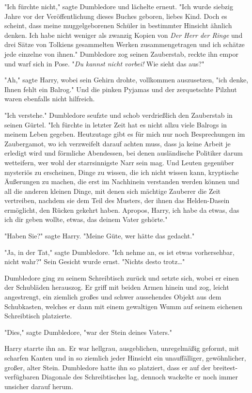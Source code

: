 {"Ich fürchte nicht," sagte Dumbledore und lächelte erneut. "Ich wurde siebzig Jahre vor der Veröffentlichung dieses Buches geboren, liebes Kind. Doch es scheint, dass meine muggelgeborenen Schüler in bestimmter Hinsicht ähnlich denken. Ich habe nicht weniger als zwanzig Kopien von \emph{Der Herr der Ringe} und drei Sätze von Tolkiens gesammelten Werken zusammengetragen und ich schätze jede einzelne von ihnen." Dumbledore zog seinen Zauberstab, reckte ihn empor und warf sich in Pose. "\emph{Du kannst nicht vorbei!} Wie sieht das aus?"

"Ah," sagte Harry, wobei sein Gehirn drohte, vollkommen auszusetzen, "ich denke, Ihnen fehlt ein Balrog." Und die pinken Pyjamas und der zerquetschte Pilzhut waren ebenfalls nicht hilfreich.

"Ich verstehe." Dumbledore seufzte und schob verdrießlich den Zauberstab in seinen Gürtel. "Ich fürchte in letzter Zeit hat es nicht allzu viele Balrogs in meinem Leben gegeben. Heutzutage gibt es für mich nur noch Besprechungen im Zaubergamot, wo ich verzweifelt darauf achten muss, dass ja keine Arbeit je erledigt wird und förmliche Abendessen, bei denen ausländische Politiker darum wetteifern, wer wohl der starrsinnigste Narr sein mag. Und Leuten gegenüber mysteriös zu erscheinen, Dinge zu wissen, die ich nicht wissen kann, kryptische Äußerungen zu machen, die erst im Nachhinein verstanden werden können und all die anderen kleinen Dinge, mit denen sich mächtige Zauberer die Zeit vertreiben, nachdem sie dem Teil des Musters, der ihnen das Helden-Dasein ermöglicht, den Rücken gekehrt haben. Apropos, Harry, ich habe da etwas, das ich dir geben wollte, etwas, das deinem Vater gehörte."

"Haben Sie?" sagte Harry. "Meine Güte, wer hätte das gedacht."

"Ja, in der Tat," sagte Dumbledore. "Ich nehme an, es ist etwas vorhersehbar, nicht wahr?" Sein Gesicht wurde ernst. "Nichts desto trotz…"

Dumbledore ging zu seinem Schreibtisch zurück und setzte sich, wobei er einen der Schubläden herauszog. Er griff mit beiden Armen hinein und zog, leicht angestrengt, ein ziemlich großes und schwer aussehendes Objekt aus dem Schubkasten, welches er dann mit einem gewaltigen Wumm auf seinem eichenen Schreibtisch platzierte.

"Dies," sagte Dumbledore, "war der Stein deines Vaters."

Harry starrte ihn an. Er war hellgrau, ausgeblichen, unregelmäßig geformt, mit scharfen Kanten und in so ziemlich jeder Hinsicht ein unauffälliger, gewöhnlicher, großer, alter Stein. Dumbledore hatte ihn so platziert, dass er auf der breitest-verfügbaren Diagonale des Schreibtisches lag, dennoch wackelte er noch immer unsicher darauf herum.

}
